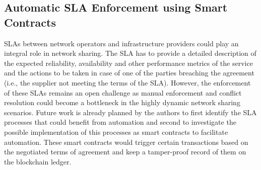 \subsection{Automatic \ac{SLA} Enforcement using Smart Contracts}%
\acfp{SLA} between network operators and infrastructure providers could play an integral role in network sharing. The \ac{SLA} has to provide a detailed description of the expected reliability, availability and other performance metrics of the service and the actions to be taken in case of one of the parties breaching the agreement (i.e., the supplier not meeting the terms of the \ac{SLA}). However, the enforcement of these \acp{SLA} remains an open challenge as manual enforcement and conflict resolution could become a bottleneck in the highly dynamic network sharing scenarios. Future work is already planned by the authors to first identify the \ac{SLA} processes that could benefit from automation and second to investigate the possible implementation of this processes as smart contracts to facilitate automation. These smart contracts would trigger certain transactions based on the negotiated terms of agreement and keep a tamper-proof record of them on the blockchain ledger.











